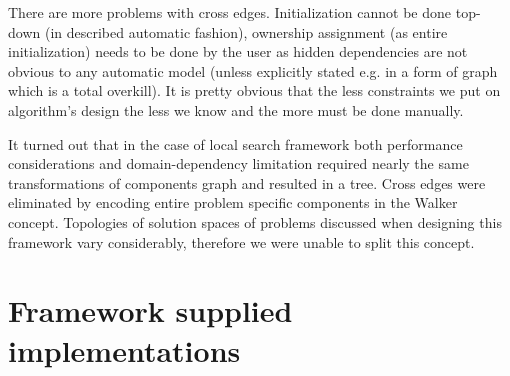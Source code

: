 There are more problems with cross edges. Initialization cannot be done
top-down (in described automatic fashion), ownership assignment (as entire
initialization) needs to be done by the user as hidden dependencies are not
obvious to any automatic model (unless explicitly stated e.g. in a form of
graph which is a total overkill). It is pretty obvious that the less
constraints we put on algorithm's design the less we know and the more must be
done manually.

It turned out that in the case of local search framework both performance
considerations and domain-dependency limitation required nearly the same
transformations of components graph and resulted in a tree. Cross edges were
eliminated by encoding entire problem specific components in the Walker
concept. Topologies of solution spaces of problems discussed when designing
this framework vary considerably, therefore we were unable to split this
concept.

\section{Framework supplied implementations}
